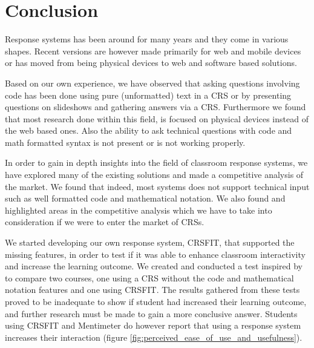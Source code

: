 \section{Conclusion}



Response systems has been around for many years and they come in various shapes. Recent versions are however made primarily for web and mobile devices or has moved from being physical devices to web and software based solutions.

Based on our own experience, we have observed that asking questions involving code has been done using pure (unformatted) text in a CRS or by presenting questions on slideshows and gathering answers via a CRS. Furthermore we found that most research done within this field, is focused on physical devices instead of the web based ones. Also the ability to ask technical questions with code and math formatted syntax is not present or is not working properly.

In order to gain in depth insights into the field of classroom response systems, we have explored many of the existing solutions and made a competitive analysis of the market. We found that indeed, most systems does not support technical input such as well formatted code and mathematical notation. We also found and highlighted areas in the competitive analysis which we have to take into consideration if we were to enter the market of CRSs.

We started developing our own response system, CRSFIT, that supported the missing features, in order to test if it was able to enhance classroom interactivity and increase the learning outcome. We created and conducted a test inspired by  to compare two courses, one using a CRS without the code and mathematical notation features and one using CRSFIT. 
The results gathered from these tests proved to be inadequate to show if student had increased their learning outcome, and further research must be made to gain a more conclusive answer. Students using CRSFIT and Mentimeter do however report that using a response system increases their interaction (figure \ref{fig:perceived_ease_of_use_and_usefulness}).






